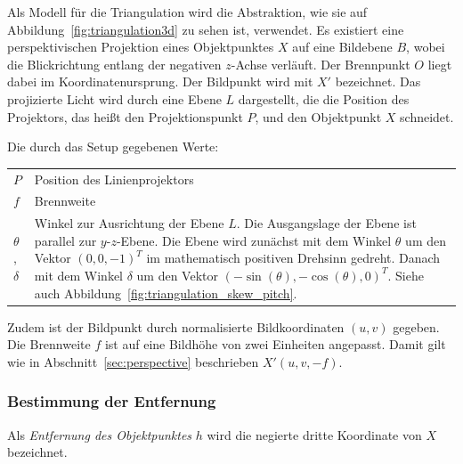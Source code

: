 \documentclass[ngerman,a4paper,parskip=half]{scrartcl}
\begin{document}
Als Modell für die Triangulation wird die Abstraktion, wie sie auf Abbildung~\ref{fig:triangulation3d} zu sehen ist, verwendet. Es existiert eine perspektivischen Projektion eines Objektpunktes $X$ auf eine Bildebene $B$, wobei die Blickrichtung entlang der negativen $z$-Achse verläuft. Der Brennpunkt $O$ liegt dabei im Koordinatenursprung. Der Bildpunkt wird mit $X'$ bezeichnet. Das projizierte Licht wird durch eine Ebene $L$ dargestellt, die die Position des Projektors, das heißt den Projektionspunkt $P$, und den Objektpunkt $X$ schneidet.

Die durch das Setup gegebenen Werte:

\begin{tabular}{lp{12cm}}
	$P$                &
		Position des Linienprojektors\\[0.5em]
	$f$                &
		Brennweite\\[0.5em]
	$\theta$,$\delta$  &
		Winkel zur Ausrichtung der Ebene $L$. Die Ausgangslage der Ebene ist parallel zur $y$-$z$-Ebene. Die Ebene wird zunächst mit dem Winkel $\theta$ um den Vektor $(0,0,-1)^T$  im mathematisch positiven Drehsinn gedreht. Danach mit dem Winkel $\delta$ um den Vektor $(-\sin(\theta), -\cos(\theta), 0)^T$. Siehe auch Abbildung~\ref{fig:triangulation_skew_pitch}.
\end{tabular}

Zudem ist der Bildpunkt durch normalisierte Bildkoordinaten $(u, v)$ gegeben. Die Brennweite $f$ ist auf eine Bildhöhe von zwei Einheiten angepasst. Damit gilt wie in Abschnitt~\ref{sec:perspective} beschrieben $X'(u, v, -f)$.

\subsubsection{Bestimmung der Entfernung}

Als \emph{Entfernung des Objektpunktes} $h$ wird die negierte dritte Koordinate von $X$ bezeichnet.
\end{document}
